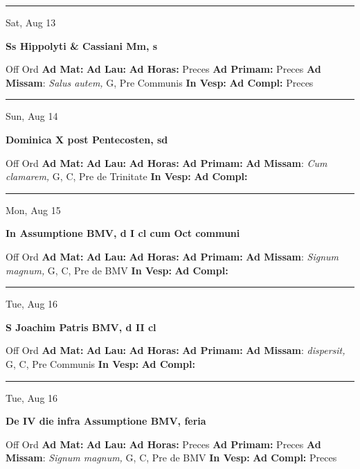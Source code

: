 \documentclass[letterpaper, 10pt]{article}
\begin{document}
\hrule
\begin{center}
Sat, Aug 13
\end{center}\textbf{ \large Ss Hippolyti \& Cassiani Mm, \textnormal{\normalsize s}}
\begin{justify}
Off Ord
\textbf{Ad Mat: }
\textbf{Ad Lau: }
\textbf{Ad Horas: }Preces
\textbf{Ad Primam: }Preces
\textbf{Ad Missam}: \textit{Salus autem,} G, Pre Communis
\textbf{In Vesp: }
\textbf{Ad Compl: }Preces\end{justify}



\hrule
\begin{center}
Sun, Aug 14
\end{center}\textbf{ \large Dominica X post Pentecosten, \textnormal{\normalsize sd}}
\begin{justify}
Off Ord
\textbf{Ad Mat: }
\textbf{Ad Lau: }
\textbf{Ad Horas: }
\textbf{Ad Primam: }
\textbf{Ad Missam}: \textit{Cum clamarem,} G, C, Pre de Trinitate
\textbf{In Vesp: }
\textbf{Ad Compl: }\end{justify}



\hrule
\begin{center}
Mon, Aug 15
\end{center}\textbf{ \large In Assumptione BMV, \textnormal{\normalsize d I cl cum Oct communi}}
\begin{justify}
Off Ord
\textbf{Ad Mat: }
\textbf{Ad Lau: }
\textbf{Ad Horas: }
\textbf{Ad Primam: }
\textbf{Ad Missam}: \textit{Signum magnum,} G, C, Pre de BMV
\textbf{In Vesp: }
\textbf{Ad Compl: }\end{justify}



\hrule
\begin{center}
Tue, Aug 16
\end{center}\textbf{ \large S Joachim Patris BMV, \textnormal{\normalsize d II cl}}
\begin{justify}
Off Ord
\textbf{Ad Mat: }
\textbf{Ad Lau: }
\textbf{Ad Horas: }
\textbf{Ad Primam: }
\textbf{Ad Missam}: \textit{dispersit,} G, C, Pre Communis
\textbf{In Vesp: }
\textbf{Ad Compl: }\end{justify}



\hrule
\begin{center}
Tue, Aug 16
\end{center}\textbf{ \large De IV die infra Assumptione BMV, \textnormal{\normalsize feria}}
\begin{justify}
Off Ord
\textbf{Ad Mat: }
\textbf{Ad Lau: }
\textbf{Ad Horas: }Preces
\textbf{Ad Primam: }Preces
\textbf{Ad Missam}: \textit{Signum magnum,} G, C, Pre de BMV
\textbf{In Vesp: }
\textbf{Ad Compl: }Preces\end{justify}
\end{document}
